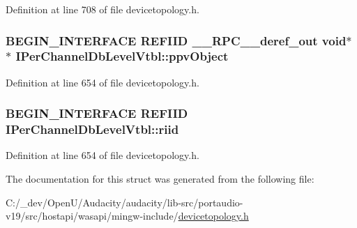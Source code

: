 Definition at line 708 of file devicetopology.\+h.

\subsubsection[{\texorpdfstring{ppv\+Object}{ppvObject}}]{\setlength{\rightskip}{0pt plus 5cm}B\+E\+G\+I\+N\+\_\+\+I\+N\+T\+E\+R\+F\+A\+CE {\bf R\+E\+F\+I\+ID} {\bf \+\_\+\+\_\+\+R\+P\+C\+\_\+\+\_\+deref\+\_\+out} {\bf void}$\ast$$\ast$ I\+Per\+Channel\+Db\+Level\+Vtbl\+::ppv\+Object}\hypertarget{struct_i_per_channel_db_level_vtbl_aaae39a4f557b7a63f008bd17c60fe41e}{}\label{struct_i_per_channel_db_level_vtbl_aaae39a4f557b7a63f008bd17c60fe41e}


Definition at line 654 of file devicetopology.\+h.

\subsubsection[{\texorpdfstring{riid}{riid}}]{\setlength{\rightskip}{0pt plus 5cm}B\+E\+G\+I\+N\+\_\+\+I\+N\+T\+E\+R\+F\+A\+CE {\bf R\+E\+F\+I\+ID} I\+Per\+Channel\+Db\+Level\+Vtbl\+::riid}\hypertarget{struct_i_per_channel_db_level_vtbl_a87a0865cb34acf93f1b7bcee11d4e9ab}{}\label{struct_i_per_channel_db_level_vtbl_a87a0865cb34acf93f1b7bcee11d4e9ab}


Definition at line 654 of file devicetopology.\+h.



The documentation for this struct was generated from the following file\+:\begin{DoxyCompactItemize}
\item 
C\+:/\+\_\+dev/\+Open\+U/\+Audacity/audacity/lib-\/src/portaudio-\/v19/src/hostapi/wasapi/mingw-\/include/\hyperlink{devicetopology_8h}{devicetopology.\+h}\end{DoxyCompactItemize}
